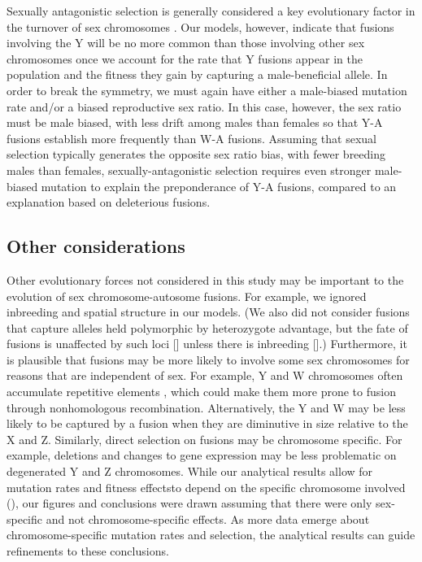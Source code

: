 Sexually antagonistic selection is generally considered a key evolutionary factor in the turnover of sex chromosomes \citep{Charlesworth1980, vandoorn2007}. Our models, however, indicate that fusions involving the Y will be no more common than those involving other sex chromosomes once we account for the rate that Y fusions appear in the population and the fitness they gain by capturing a male-beneficial allele. In order to break the symmetry, we must again have either a male-biased mutation rate and/or a biased reproductive sex ratio. In this case, however, the sex ratio must be male biased, with less drift among males than females so that Y-A fusions establish more frequently than W-A fusions. Assuming that sexual selection typically generates the opposite sex ratio bias, with fewer breeding males than females, sexually-antagonistic selection requires even stronger male-biased mutation to explain the preponderance of Y-A fusions, compared to an explanation based on deleterious fusions. 

\subsection{Other considerations}

Other evolutionary forces not considered in this study may be important to the evolution of sex chromosome-autosome fusions. For example, we ignored inbreeding and spatial structure in our models. (We also did not consider fusions that capture alleles held polymorphic by heterozygote advantage, but the fate of fusions is unaffected by such loci [\citealt{Charlesworth1980}] unless there is inbreeding [\citealt{Charlesworth1999}].)
Furthermore, it is plausible that fusions may be more likely to involve some sex chromosomes for reasons that are independent of sex. For example, Y and W chromosomes often accumulate repetitive elements \citep{Bull1983, Charlesworth2005}, which could make them more prone to fusion through nonhomologous recombination. Alternatively, the Y and W may be less likely to be captured by a fusion when they are diminutive in size relative to the X and Z. Similarly, direct selection on fusions may be chromosome specific. For example, deletions and changes to gene expression may be less problematic on degenerated Y and Z chromosomes. While our analytical results allow for mutation rates and fitness effectsto depend on the specific chromosome involved (), our figures and conclusions were drawn assuming that there were only sex-specific and not chromosome-specific effects. As more data emerge about chromosome-specific mutation rates and selection, the analytical results can guide refinements to these conclusions. 

